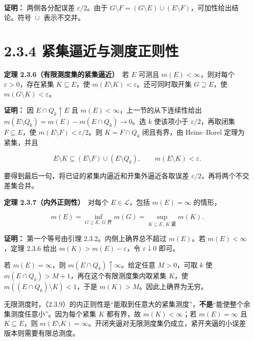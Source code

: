 \documentclass[11pt,a4paper]{article}
\begin{document}
\textbf{证明：} 两侧各分配误差 \(\varepsilon/2\)。由于
\(G\setminus F=(G\setminus E)\mathbin{\dot\cup}(E\setminus F)\)，可加性给出结论。符号
\(\dot\cup\) 表示不交并。

\section[\S{}2.3.4
紧集逼近与测度正则性]{2.3.4
紧集逼近与测度正则性}\label{ux7d27ux96c6ux903cux8fd1ux4e0eux6d4bux5ea6ux6b63ux5219ux6027}

\textbf{定理 2.3.6（有限测度集的紧集逼近）}　若 \(E\) 可测且
\(m(E)<\infty\)，则对每个 \(\varepsilon>0\)，存在紧集
\(K\subseteq E\)，使 \(m(E\setminus K)<\varepsilon\)。还可同时取开集
\(G\supseteq E\)，使 \(m(G\setminus K)<\varepsilon\)。

\textbf{证明：} 因 \(E\cap Q_k\uparrow E\) 且
\(m(E)<\infty\)，上一节的从下连续性给出
\(m(E\setminus Q_k)=m(E)-m(E\cap Q_k)\to0\)。选 \(k\) 使该项小于
\(\varepsilon/2\)，再取闭集 \(F\subseteq E\)，使
\(m(E\setminus F)<\varepsilon/2\)。则 \(K=F\cap Q_k\) 闭且有界，由
Heine--Borel 定理为紧集，并且

\begin{equation*}
E\setminus K\subseteq(E\setminus F)\cup(E\setminus Q_k),
\qquad m(E\setminus K)<\varepsilon.
\tag{2.3.8}
\end{equation*}

要得到最后一句，将已证的紧集内逼近和开集外逼近各取误差
\(\varepsilon/2\)，再将两个不交差集合并。

\textbf{定理 2.3.7（内外正则性）}　对每个 \(E\in\mathcal L\)，包括
\(m(E)=\infty\) 的情形，

\begin{equation*}
m(E)=\inf_{G\supseteq E,\ G\text{ 开}}m(G)
=\sup_{K\subseteq E,\ K\text{ 紧}}m(K).
\tag{2.3.9}
\end{equation*}

\textbf{证明：} 第一个等号由引理 2.3.2。内侧上确界总不超过 \(m(E)\)。若
\(m(E)<\infty\)，定理 2.3.6 给出 \(m(K)>m(E)-\varepsilon\)，令
\(\varepsilon\downarrow0\) 即可。

若 \(m(E)=\infty\)，则 \(m(E\cap Q_k)\uparrow\infty\)。给定任意
\(M>0\)，可取 \(k\) 使 \(m(E\cap Q_k)>M+1\)，再在这个有限测度集内取紧集
\(K\)，使 \(m((E\cap Q_k)\setminus K)<1\)，于是
\(m(K)>M\)。因此上确界为无穷。

无限测度时，（2.3.9）的内正则性是``能取到任意大的紧集测度''，\textbf{不是}``能使整个余集测度任意小''。因为每个紧集
\(K\) 都有界，故 \(m(K)<\infty\)；若 \(m(E)=\infty\) 且
\(K\subseteq E\)，则
\(m(E\setminus K)=\infty\)。开闭夹逼对无限测度集仍成立，紧开夹逼的小误差版本则需要有限总测度。
\end{document}
